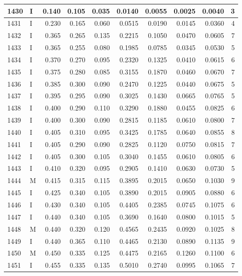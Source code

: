 \documentclass[9pt,twocolumn,twoside,]{pnas-new}
\begin{document}
\begin{tabular}{l|l|r|r|r|r|r|r|r|r}
\hline
1430 & I & 0.140 & 0.105 & 0.035 & 0.0140 & 0.0055 & 0.0025 & 0.0040 & 3\\
\hline
1431 & I & 0.230 & 0.165 & 0.060 & 0.0515 & 0.0190 & 0.0145 & 0.0360 & 4\\
\hline
1432 & I & 0.365 & 0.265 & 0.135 & 0.2215 & 0.1050 & 0.0470 & 0.0605 & 7\\
\hline
1433 & I & 0.365 & 0.255 & 0.080 & 0.1985 & 0.0785 & 0.0345 & 0.0530 & 5\\
\hline
1434 & I & 0.370 & 0.270 & 0.095 & 0.2320 & 0.1325 & 0.0410 & 0.0615 & 6\\
\hline
1435 & I & 0.375 & 0.280 & 0.085 & 0.3155 & 0.1870 & 0.0460 & 0.0670 & 7\\
\hline
1436 & I & 0.385 & 0.300 & 0.090 & 0.2470 & 0.1225 & 0.0440 & 0.0675 & 5\\
\hline
1437 & I & 0.395 & 0.295 & 0.090 & 0.3025 & 0.1430 & 0.0665 & 0.0765 & 5\\
\hline
1438 & I & 0.400 & 0.290 & 0.110 & 0.3290 & 0.1880 & 0.0455 & 0.0825 & 6\\
\hline
1439 & I & 0.400 & 0.300 & 0.090 & 0.2815 & 0.1185 & 0.0610 & 0.0800 & 7\\
\hline
1440 & I & 0.405 & 0.310 & 0.095 & 0.3425 & 0.1785 & 0.0640 & 0.0855 & 8\\
\hline
1441 & I & 0.405 & 0.290 & 0.090 & 0.2825 & 0.1120 & 0.0750 & 0.0815 & 7\\
\hline
1442 & I & 0.405 & 0.300 & 0.105 & 0.3040 & 0.1455 & 0.0610 & 0.0805 & 6\\
\hline
1443 & I & 0.410 & 0.320 & 0.095 & 0.2905 & 0.1410 & 0.0630 & 0.0730 & 5\\
\hline
1444 & M & 0.415 & 0.315 & 0.115 & 0.3895 & 0.2015 & 0.0650 & 0.1030 & 9\\
\hline
1445 & I & 0.425 & 0.340 & 0.105 & 0.3890 & 0.2015 & 0.0905 & 0.0880 & 6\\
\hline
1446 & I & 0.430 & 0.340 & 0.105 & 0.4405 & 0.2385 & 0.0745 & 0.1075 & 6\\
\hline
1447 & I & 0.440 & 0.340 & 0.105 & 0.3690 & 0.1640 & 0.0800 & 0.1015 & 5\\
\hline
1448 & M & 0.440 & 0.320 & 0.120 & 0.4565 & 0.2435 & 0.0920 & 0.1025 & 8\\
\hline
1449 & I & 0.440 & 0.365 & 0.110 & 0.4465 & 0.2130 & 0.0890 & 0.1135 & 9\\
\hline
1450 & M & 0.450 & 0.335 & 0.125 & 0.4475 & 0.2165 & 0.1260 & 0.1100 & 6\\
\hline
1451 & I & 0.455 & 0.335 & 0.135 & 0.5010 & 0.2740 & 0.0995 & 0.1065 & 7\\

\end{tabular}
\end{document}
